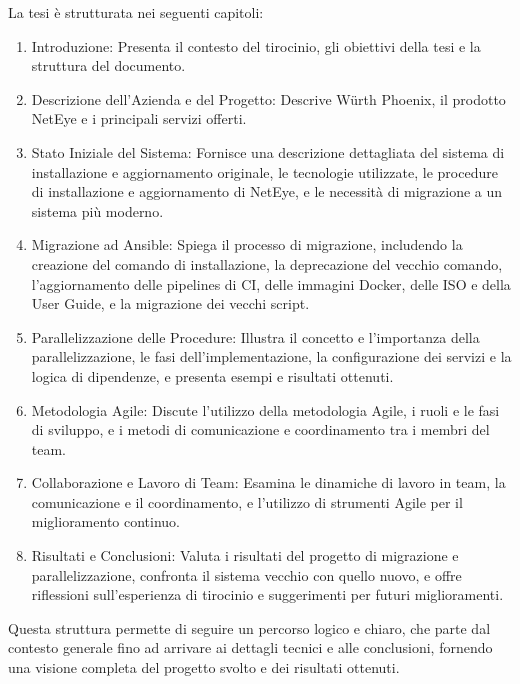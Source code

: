 La tesi è strutturata nei seguenti capitoli:
\begin{enumerate}
  \item Introduzione: Presenta il contesto del tirocinio, gli obiettivi della tesi
    e la struttura del documento.

  \item Descrizione dell’Azienda e del Progetto: Descrive Würth Phoenix, il prodotto
    NetEye e i principali servizi offerti.

  \item Stato Iniziale del Sistema: Fornisce una descrizione dettagliata del
    sistema di installazione e aggiornamento originale, le tecnologie utilizzate,
    le procedure di installazione e aggiornamento di NetEye, e le necessità di migrazione
    a un sistema più moderno.

  \item Migrazione ad Ansible: Spiega il processo di migrazione, includendo la creazione
    del comando di installazione, la deprecazione del vecchio comando, l'aggiornamento
    delle pipelines di CI, delle immagini Docker, delle ISO e della User Guide,
    e la migrazione dei vecchi script.

  \item Parallelizzazione delle Procedure: Illustra il concetto e l'importanza
    della parallelizzazione, le fasi dell'implementazione, la configurazione dei
    servizi e la logica di dipendenze, e presenta esempi e risultati ottenuti.

  \item Metodologia Agile: Discute l'utilizzo della metodologia Agile, i ruoli e
    le fasi di sviluppo, e i metodi di comunicazione e coordinamento tra i
    membri del team.

  \item Collaborazione e Lavoro di Team: Esamina le dinamiche di lavoro in team,
    la comunicazione e il coordinamento, e l'utilizzo di strumenti Agile per il
    miglioramento continuo.

  \item Risultati e Conclusioni: Valuta i risultati del progetto di migrazione e
    parallelizzazione, confronta il sistema vecchio con quello nuovo, e offre
    riflessioni sull'esperienza di tirocinio e suggerimenti per futuri
    miglioramenti.
\end{enumerate}
Questa struttura permette di seguire un percorso logico e chiaro, che parte dal contesto
generale fino ad arrivare ai dettagli tecnici e alle conclusioni, fornendo una
visione completa del progetto svolto e dei risultati ottenuti.